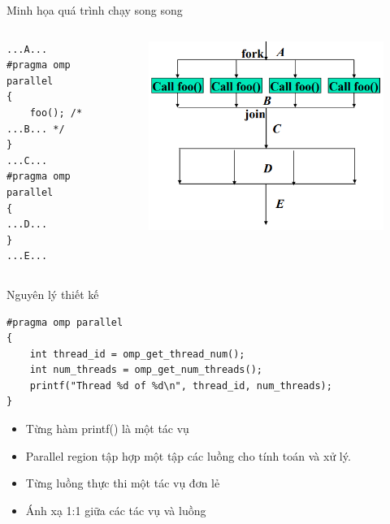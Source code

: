 \documentclass[10pt]{beamer}
\theoremstyle{remark}
\numberwithin{algocf}{section}
\numberwithin{equation}{section}
\numberwithin{dl}{section}
\numberwithin{figure}{section}
\begin{document}
\begin{frame}[fragile]{Minh họa quá trình chạy song song}
    \begin{columns}[onlytextwidth]
        \begin{column}{0.5\textwidth}
            \begin{verbatim}
...A... 
#pragma omp parallel
{
    foo(); /* ...B... */
}
...C... 
#pragma omp parallel
{
...D...
}
...E...
            \end{verbatim}
        \end{column}
        \begin{column}{0.5\textwidth}
            \begin{figure}[H]
                \centering
                \includegraphics[width=\linewidth]{figures/OpenMP/Fork.png}
            \end{figure}
        \end{column}
    \end{columns}
\end{frame}

\begin{frame}[fragile]{Nguyên lý thiết kế}
    \begin{verbatim}
#pragma omp parallel
{
    int thread_id = omp_get_thread_num();
    int num_threads = omp_get_num_threads();
    printf("Thread %d of %d\n", thread_id, num_threads); 
}
    \end{verbatim}
    \begin{itemize}
        \item Từng hàm printf() là một tác vụ
        \item Parallel region tập hợp một tập các luồng cho tính toán và xử lý.
        \item Từng luồng thực thi một tác vụ đơn lẻ
        \item Ánh xạ 1:1 giữa các tác vụ và luồng
    \end{itemize}
\end{frame}
\end{document}
